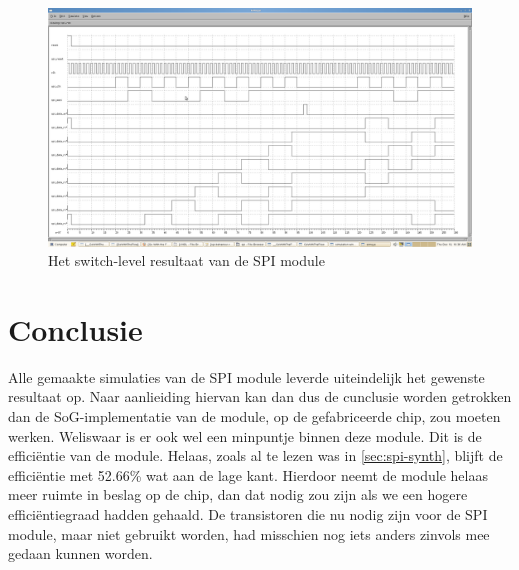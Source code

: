 \documentclass{scrartcl} %
\begin{document}
\begin{figure}[H]
	\centering
	\includegraphics[width=\textwidth]{resource/switchlevelSPI.png}
	\caption{Het switch-level resultaat van de SPI module}
	\label{fig:spi-sls}
\end{figure}

\section{Conclusie}
Alle gemaakte simulaties van de SPI module leverde uiteindelijk het gewenste resultaat op. Naar aanlieiding hiervan kan dan dus de cunclusie worden getrokken dan de SoG-implementatie van de module, op de gefabriceerde chip, zou moeten werken. Weliswaar is er ook wel een minpuntje binnen deze module. Dit is de effici\"entie van de module. Helaas, zoals al te lezen was in \ref{sec:spi-synth}, blijft de efficiëntie met 52.66\% wat aan de lage kant. Hierdoor neemt de module helaas meer ruimte in beslag op de chip, dan dat nodig zou zijn als we een hogere efficiëntiegraad hadden gehaald. De transistoren die nu nodig zijn voor de SPI module, maar niet gebruikt worden, had misschien nog iets anders zinvols mee gedaan kunnen worden. 
\end{document}
